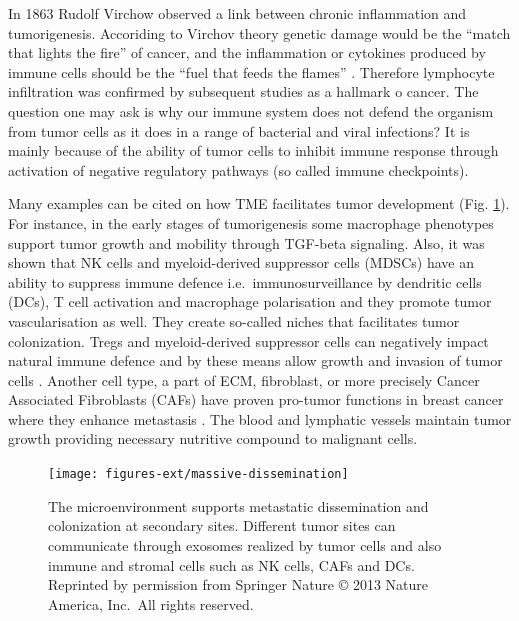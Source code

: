 \documentclass[12pt,]{book}
\theoremstyle{definition}
\theoremstyle{definition}
\theoremstyle{definition}
\theoremstyle{remark}
\begin{document}
In 1863 Rudolf Virchow observed a link between chronic inflammation and
tumorigenesis. Accoriding to Virchov theory genetic damage would be the
``match that lights the fire'' of cancer, and the inflammation or
cytokines produced by immune cells should be the ``fuel that feeds the
flames'' \citep{Balkwill2001}. Therefore lymphocyte infiltration was
confirmed by subsequent studies as a hallmark o cancer. The question one
may ask is why our immune system does not defend the organism from tumor
cells as it does in a range of bacterial and viral infections? It is
mainly because of the ability of tumor cells to inhibit immune response
through activation of negative regulatory pathways (so called immune
checkpoints).

Many examples can be cited on how TME facilitates tumor development
(Fig. \ref{fig:met-dis}). For instance, in the early stages of
tumorigenesis some macrophage phenotypes support tumor growth and
mobility through TGF-beta signaling. Also, it was shown that NK cells
and myeloid-derived suppressor cells (MDSCs) have an ability to suppress
immune defence i.e.~immunosurveillance by dendritic cells (DCs), T cell
activation and macrophage polarisation and they promote tumor
vascularisation as well. \citep{Talmadge2013, Gabrilovich2012} They
create so-called niches that facilitates tumor colonization. Tregs and
myeloid-derived suppressor cells can negatively impact natural immune
defence and by these means allow growth and invasion of tumor cells
\citep{Taube2017a}. Another cell type, a part of ECM, fibroblast, or
more precisely Cancer Associated Fibroblasts (CAFs) have proven
pro-tumor functions in breast cancer where they enhance metastasis
\citep{Dumont2013}. The blood and lymphatic vessels maintain tumor
growth providing necessary nutritive compound to malignant cells.

\begin{figure}

{\centering \texttt{[image: figures-ext/massive-dissemination]} 

}

\caption{The microenvironment supports metastatic
dissemination and colonization at secondary sites. Different tumor sites
can communicate through exosomes realized by tumor cells and also immune
and stromal cells such as NK cells, CAFs and DCs. Reprinted by
permission from Springer Nature \citep{Quail2013} © 2013 Nature America,
Inc.~All rights reserved.}\label{fig:met-dis}
\end{figure}
\end{document}
